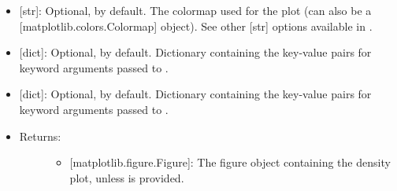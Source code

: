 \documentclass[letterpaper,10pt,english]{sphinxmanual}
\begin{document}
\begin{fulllineitems}
\begin{itemize}
\begin{description}
\begin{itemize}
\item {} 
 {[}str{]}: Optional,  by default. The colormap
used for the plot (can also be a {[}matplotlib.colors.Colormap{]}
object). See other {[}str{]} options available in .

\item {} 
 {[}dict{]}: Optional, \sphinxcode{\sphinxupquote{\{\}}} by default. Dictionary
containing the key-value pairs for keyword arguments passed to
.

\item {} 
 {[}dict{]}: Optional, \sphinxcode{\sphinxupquote{\{\}}} by default. Dictionary
containing the key-value pairs for keyword arguments passed to
.

\end{itemize}

\end{description}

\end{itemize}
\begin{itemize}
\item {} \begin{description}
\item[{Returns:}] \leavevmode\begin{itemize}
\item {} 
{[}matplotlib.figure.Figure{]}: The figure object containing the
density plot, unless  is provided.

\end{itemize}

\end{description}

\end{itemize}

\end{fulllineitems}

\end{document}
